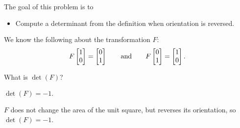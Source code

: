 \documentclass{problemset}
\newcommand{\displayonlynewpage}{\begin{displayonly}\newpage\end{displayonly}}
\newcommand{\bookonlynewpage}{\begin{bookonly}\newpage\end{bookonly}}
\begin{document}
	\displayonlynewpage
	\bookonlynewpage
	\question
	\begin{annotation}
		\begin{goals}

			The goal of this problem is to
			\begin{itemize}
				\item Compute a determinant from the definition when orientation is reversed.
			\end{itemize}
		\end{goals}
	\end{annotation}
	We know the following about the transformation $F$:
	\[
		F\mat{1\\0}=\mat{0\\1}\qquad\text{and}\qquad F\mat{0\\1}=\mat{1\\0}.
	\]
	\begin{parts}
		\item What is $\det(F)$?
			\begin{solution}
				$\det(F)=-1$.

				$F$ does not change the area of the unit square, but reverses its
				orientation, so $\det(F)=-1$.
			\end{solution}
	\end{parts}
\end{document}
